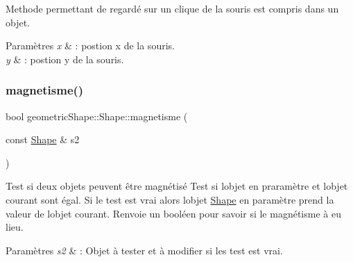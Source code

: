 Methode permettant de regardé sur un clique de la souris est compris dans un objet. 


\begin{DoxyParams}{Paramètres}
{\em x} & \+: postion x de la souris. \\
\hline
{\em y} & \+: postion y de la souris. \\
\hline
\end{DoxyParams}
\mbox{\label{classgeometric_shape_1_1_shape_af2882c1c1968a92bdccd568f08a9c1d1}} 
\subsubsection{\texorpdfstring{magnetisme()}{magnetisme()}}
{\footnotesize\ttfamily bool geometric\+Shape\+::\+Shape\+::magnetisme (\begin{DoxyParamCaption}\item[{const \hyperlink{classgeometric_shape_1_1_shape}{Shape} \&}]{s2 }\end{DoxyParamCaption})\hspace{0.3cm}{\ttfamily [protected]}}



Test si deux objets peuvent être magnétisé Test si l\textquotesingle{}objet en praramètre et l\textquotesingle{}objet courant sont égal. Si le test est vrai alors l\textquotesingle{}objet \hyperlink{classgeometric_shape_1_1_shape}{Shape} en paramètre prend la valeur de l\textquotesingle{}objet courant. Renvoie un booléen pour savoir si le magnétisme à eu lieu. 


\begin{DoxyParams}{Paramètres}
{\em s2} & \+: Objet à tester et à modifier si les test est vrai. \\
\hline
\end{DoxyParams}
\mbox{\label{classgeometric_shape_1_1_shape_a56c25b597e4a88d0a5d099efd3dfab9d}} 
